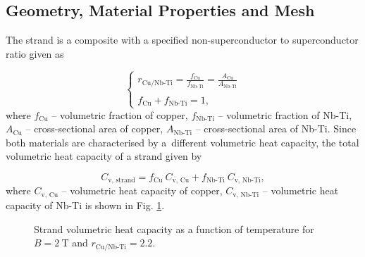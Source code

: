 
\subsection{Geometry, Material Properties and Mesh}

The strand is a composite with a specified non-superconductor to superconductor ratio given as 

\begin{equation}
    \left\{ \begin{array}{ll}
    r_\text{Cu/Nb-Ti} = \frac{f_\text{Cu}}{f_\text{Nb-Ti}} = \frac{A_\text{Cu}}{A_\text{Nb-Ti}}\\ \\
    f_\text{Cu} + f_\text{Nb-Ti} = 1,
    \end{array} \right.
    \label{eqn: non_super_to_super_ratio}
\end{equation}
where $f_\text{Cu}$ -- volumetric fraction of copper, $f_\text{Nb-Ti}$ -- volumetric fraction of Nb-Ti, $A_\text{Cu}$ -- cross-sectional area of copper, $A_\text{Nb-Ti}$ -- cross-sectional area of Nb-Ti. Since both materials are characterised by a~different volumetric heat capacity, the total volumetric heat capacity of a strand given by

\begin{equation}
    C_\text{v, strand} = f_\text{Cu} ~ C_\text{v, Cu} + f_\text{Nb-Ti} ~ C_\text{v, Nb-Ti},
    \label{eqn: cv_equiv}
\end{equation}
where $C_\text{v, Cu}$ -- volumetric heat capacity of copper, $C_\text{v, Nb-Ti}$ -- volumetric heat capacity of Nb-Ti is shown in Fig. \ref{fig:eq_wind_cp}.

\begin{figure}[H]
\centering
    \caption{Strand volumetric heat capacity as a function of temperature for $B=2~\text{T}$ and $r_\text{Cu/Nb-Ti}=2.2$.}
    \label{fig:eq_wind_cp}
\end{figure}

